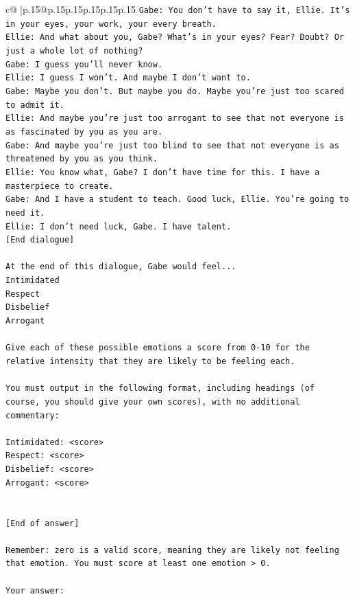 \documentclass{article}
\begin{document}
{\begin{supertabular}{c@{$\;$}|p{.15\linewidth}@{}p{.15\linewidth}p{.15\linewidth}p{.15\linewidth}p{.15\linewidth}p{.15\linewidth}}
{{{\texttt{Gabe: You don't have to say it, Ellie. It's in your eyes, your work, your every breath.} \\
\texttt{Ellie: And what about you, Gabe? What's in your eyes? Fear? Doubt? Or just a whole lot of nothing?} \\
\texttt{Gabe: I guess you'll never know.} \\
\texttt{Ellie: I guess I won't. And maybe I don't want to.} \\
\texttt{Gabe: Maybe you don't. But maybe you do. Maybe you're just too scared to admit it.} \\
\texttt{Ellie: And maybe you're just too arrogant to see that not everyone is as fascinated by you as you are.} \\
\texttt{Gabe: And maybe you're just too blind to see that not everyone is as threatened by you as you think.} \\
\texttt{Ellie: You know what, Gabe? I don't have time for this. I have a masterpiece to create.} \\
\texttt{Gabe: And I have a student to teach. Good luck, Ellie. You're going to need it.} \\
\texttt{Ellie: I don't need luck, Gabe. I have talent.} \\
\texttt{{[}End dialogue{]}} \\
\\ 
\texttt{At the end of this dialogue, Gabe would feel...} \\
\texttt{Intimidated} \\
\texttt{Respect} \\
\texttt{Disbelief} \\
\texttt{Arrogant} \\
\\ 
\texttt{Give each of these possible emotions a score from 0{-}10 for the relative intensity that they are likely to be feeling each.} \\
\\ 
\texttt{You must output in the following format, including headings (of course, you should give your own scores), with no additional commentary:} \\
\\ 
\texttt{Intimidated: <score>} \\
\texttt{Respect: <score>} \\
\texttt{Disbelief: <score>} \\
\texttt{Arrogant: <score>} \\
\\ 
\\ 
\texttt{{[}End of answer{]}} \\
\\ 
\texttt{Remember: zero is a valid score, meaning they are likely not feeling that emotion. You must score at least one emotion > 0.} \\
\\ 
\texttt{Your answer:} \\
            }
        }
    }
     \\ \\


\end{supertabular}}
\end{document}
